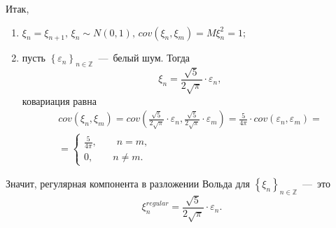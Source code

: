 Итак,
\begin{enumerate}
  \item $ \xi_n = \xi_{n + 1}, \,
    \xi_n \sim N \left( 0, 1 \right), \,
    cov \left( \xi_n, \xi_m \right) = M \xi_n^2 = 1$;
  \item пусть $ \left\{ \varepsilon_n \right\}_{n \in \mathbb{Z}}$~---~белый шум.
  Тогда
  \begin{equation*}
    \xi_n = \frac{ \sqrt{5}}{2 \sqrt{ \pi }} \cdot \varepsilon_n,
  \end{equation*}
  ковариация равна
  \begin{gather*}
    cov \left( \xi_n, \xi_m \right) =
    cov \left(
      \frac{ \sqrt{5}}{2 \sqrt{ \pi }} \cdot \varepsilon_n,
      \frac{ \sqrt{5}}{2 \sqrt{ \pi }} \cdot \varepsilon_m
    \right) =
    \frac{5}{4 \pi } \cdot cov \left( \varepsilon_n, \varepsilon_m \right) = \\
    = \begin{cases}
      \frac{5}{4 \pi }, \qquad n = m, \\
      0, \qquad n \neq m.
    \end{cases}
  \end{gather*}
\end{enumerate}

Значит,
регулярная компонента в разложении Вольда для $ \left\{ \xi_n \right\}_{n \in \mathbb{Z}}$~---~это
\begin{equation*}
  \xi_n^{regular} =
  \frac{ \sqrt{5}}{2 \sqrt{ \pi }} \cdot \varepsilon_n.
\end{equation*}
